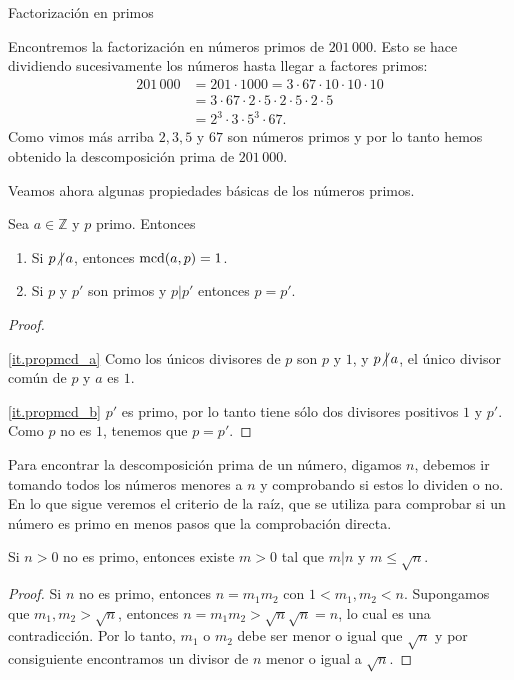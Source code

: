 \begin{section}{Factorización en primos}
\begin{ejemplo*} 
Encontremos la factorización en números primos de $201\,000$. Esto se hace di\-vi\-dien\-do  sucesivamente los números hasta llegar a factores primos:
\begin{align*}
201\,000 &= 201\cdot 1000 = 3\cdot 67\cdot 10\cdot 10\cdot 10\\ &=  3\cdot 67\cdot 2\cdot 5 \cdot 2\cdot 5 \cdot 2\cdot 5 \\&= 2^3\cdot 3\cdot 5^3\cdot 67.
\end{align*}
Como vimos más arriba $2, 3, 5$ y $67$ son  números primos y por lo tanto hemos obtenido la descomposición prima de $201\,000$.
\end{ejemplo*}


Veamos ahora algunas propiedades básicas de los números primos.

\begin{observacion} \label{pdivpp}
Sea $a \in \mathbb Z$ y $p$ primo. Entonces 
\begin{enumerate}[label=\textit{\alph*)}]
\item\label{it.propmcd_a}  Si $p{\operatorname{\not|\,} }a$, entonces $\operatorname{mcd}(a,p) = 1$.
\item\label{it.propmcd_b}  Si $p$ y $p'$ son primos y $p|p'$ entonces $p=p'$.
\end{enumerate}
\end{observacion}
\begin{proof}
\

\noindent \ref{it.propmcd_a} Como los únicos divisores de $p$ son $p$ y $1$, y $p{\operatorname{\not|\,} }a$, el único  divisor común de $p$ y $a$ es $1$.

\noindent \ref{it.propmcd_b} $p'$ es primo, por lo tanto tiene sólo dos divisores positivos $1$ y $p'$. Como $p$ no es $1$, tenemos que  $p=p'$.
\end{proof}

Para encontrar la descomposición prima de un número, digamos $n$, debemos ir tomando todos los números menores a $n$ y comprobando si estos lo dividen o no. En lo que sigue veremos el criterio de la raíz, que se utiliza para comprobar si un número es primo en menos pasos que la comprobación directa.  

\begin{lema} Si $n>0$ no es primo, entonces existe $m>0$ tal que $m|n$ y $m \le \sqrt{n}$.  
\end{lema}
\begin{proof}
Si $n$ no es primo, entonces $n = m_1m_2$ con $1 < m_1,m_2 < n$. Supongamos que $m_1,m_2 > \sqrt n$, entonces $n = m_1m_2 >  \sqrt n\sqrt n = n$, lo cual es una contradicción. Por lo tanto, $m_1$ o $m_2$ debe ser menor o igual que $\sqrt n$ y por consiguiente encontramos un divisor de $n$ menor o igual a  $\sqrt n$. 
\end{proof}


\end{section}
